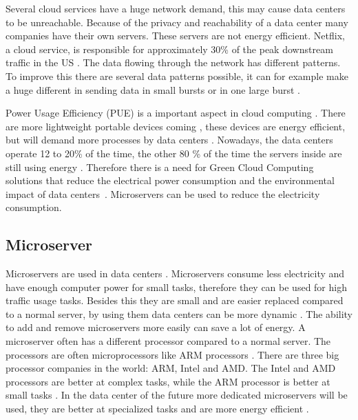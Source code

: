 \documentclass{sig-alternate-br}
\begin{document}
Several cloud services have a huge network demand, this may cause data centers to be unreachable. Because of the privacy and reachability of a data center many companies have their own servers. These servers are not energy efficient. \newline
Netflix, a cloud service, is responsible for approximately 30\% of the peak downstream traffic in the US \cite{Adhikari:2012, computer-networking}. The data flowing through the network has different patterns. To improve this there are several data patterns possible, it can for example make a huge different in sending data in small bursts or in one large burst \cite{computer-networking}.

Power Usage Efficiency (PUE) is a important aspect in cloud computing \cite{beloglazov2012energy}. There are more lightweight portable devices coming \cite{Miettinen:2010:EEM:1863103.1863107}, these devices are energy efficient, but will demand more processes by data centers \cite{Miettinen:2010:EEM:1863103.1863107}. Nowadays, the data centers operate 12 to 20\% of the time, the other 80 \% of the time the servers inside are still using energy \cite{beloglazov2012energy, meisner2009powernap}. Therefore there is a need for Green Cloud Computing solutions that reduce the electrical power consumption and the environmental impact of data centers~\cite{beloglazov2012energy}. Microservers can be used to reduce the electricity consumption.

\subsection{Microserver}
Microservers are used in data centers \cite{microserver}. Microservers consume less electricity and have enough computer power for small tasks, therefore they can be used for high traffic usage tasks. Besides this they are small and are easier replaced compared to a normal server, by using them data centers can be more dynamic \cite{microserver}. The ability to add and remove microservers more easily can save a lot of energy. \newline
A microserver often has a different processor compared to a normal server. The processors are often microprocessors like ARM processors \cite{microserver}. There are three big processor companies in the world: ARM, Intel and AMD. The Intel and AMD processors are better at complex tasks, while the ARM processor is better at small tasks \cite{microserver}. In the data center of the future more dedicated microservers will be used, they are better at specialized tasks and are more energy efficient \cite{microserver}. 
\end{document}
